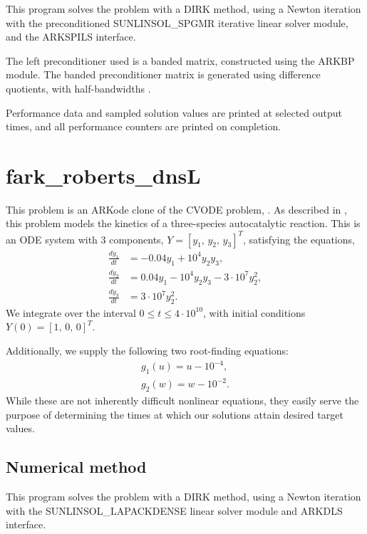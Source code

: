 \documentclass[letterpaper,10pt,english]{sphinxmanual}
\begin{document}
This program solves the problem with a DIRK method, using a Newton
iteration with the preconditioned SUNLINSOL\_SPGMR iterative linear
solver module, and the ARKSPILS interface.

The left preconditioner used is a banded matrix, constructed using
the ARKBP module.  The banded preconditioner matrix is generated using
difference quotients, with half-bandwidths .

Performance data and sampled solution values are printed at
selected output times, and all performance counters are printed
on completion.


\section{fark\_roberts\_dnsL}
\label{\detokenize{f77_serial:fark-roberts-dnsl}}\label{\detokenize{f77_serial:id3}}
This problem is an ARKode clone of the CVODE problem,
.  As described in \label{\detokenize{f77_serial:id4}}{\hyperref[\detokenize{References:hsr2017}]{\sphinxcrossref{{[}HSR2017{]}}}}, this problem models
the kinetics of a three-species autocatalytic reaction.  This is an
ODE system with 3 components, \(Y = [y_1,\, y_2,\, y_3]^T\),
satisfying the equations,
\begin{equation*}
\begin{split}\frac{d y_1}{dt} &= -0.04 y_1 + 10^4 y_2 y_3, \\
\frac{d y_2}{dt} &= 0.04 y_1 - 10^4 y_2 y_3 - 3\cdot10^7 y_2^2, \\
\frac{d y_3}{dt} &= 3\cdot10^7 y_2^2.\end{split}
\end{equation*}
We integrate over the interval \(0\le t\le 4\cdot10^{10}\), with initial
conditions  \(Y(0) = [1,\, 0,\, 0]^T\).

Additionally, we supply the following two root-finding equations:
\begin{equation*}
\begin{split}g_1(u) = u - 10^{-4}, \\
g_2(w) = w - 10^{-2}.\end{split}
\end{equation*}
While these are not inherently difficult nonlinear equations, they
easily serve the purpose of determining the times at which our
solutions attain desired target values.


\subsection{Numerical method}
\label{\detokenize{f77_serial:id5}}
This program solves the problem with a DIRK method, using a Newton
iteration with the SUNLINSOL\_LAPACKDENSE linear solver module and
ARKDLS interface.
\end{document}
